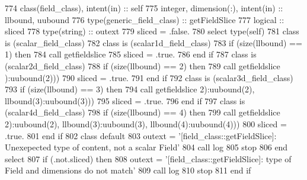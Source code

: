 \begin{DoxyCode}
774     \textcolor{keywordtype}{class}(field\_class), \textcolor{keywordtype}{intent(in)} :: self
775     \textcolor{keywordtype}{integer}, \textcolor{keywordtype}{dimension(:)}, \textcolor{keywordtype}{intent(in)} :: llbound, uubound
776     \textcolor{keywordtype}{type}(generic\_field\_class) :: getFieldSlice
777     \textcolor{keywordtype}{logical} :: sliced
778     \textcolor{keywordtype}{type}(string) :: outext
779     sliced = .false.
780     \textcolor{keywordflow}{select type}(self)
781 \textcolor{keywordflow}{    class is} (scalar\_field\_class)
782 \textcolor{keywordflow}{    class is} (scalar1d\_field\_class)
783         \textcolor{keywordflow}{if} (\textcolor{keyword}{size}(llbound) == 1) \textcolor{keywordflow}{then}
784             \textcolor{keyword}{call }getfieldslice%
785             sliced = .true.
786 \textcolor{keywordflow}{        end if}
787 \textcolor{keywordflow}{    class is} (scalar2d\_field\_class)
788         \textcolor{keywordflow}{if} (\textcolor{keyword}{size}(llbound) == 2) \textcolor{keywordflow}{then}
789             \textcolor{keyword}{call }getfieldslice%
      ):uubound(2)))
790             sliced = .true.
791 \textcolor{keywordflow}{        end if}
792 \textcolor{keywordflow}{    class is} (scalar3d\_field\_class)
793         \textcolor{keywordflow}{if} (\textcolor{keyword}{size}(llbound) == 3) \textcolor{keywordflow}{then}
794             \textcolor{keyword}{call }getfieldslice%
      2):uubound(2), llbound(3):uubound(3)))
795             sliced = .true.
796 \textcolor{keywordflow}{        end if}
797 \textcolor{keywordflow}{    class is} (scalar4d\_field\_class)
798         \textcolor{keywordflow}{if} (\textcolor{keyword}{size}(llbound) == 4) \textcolor{keywordflow}{then}
799             \textcolor{keyword}{call }getfieldslice%
      2):uubound(2), llbound(3):uubound(3), llbound(4):uubound(4)))
800             sliced = .true.
801 \textcolor{keywordflow}{        end if}
802 \textcolor{keywordflow}{        class default}
803         outext = \textcolor{stringliteral}{'[field\_class::getFieldSlice]: Unexepected type of content, not a scalar Field'}
804         \textcolor{keyword}{call }log%
805         stop
806 \textcolor{keywordflow}{    end select}
807     \textcolor{keywordflow}{if} (.not.sliced) \textcolor{keywordflow}{then}
808         outext = \textcolor{stringliteral}{'[field\_class::getFieldSlice]: type of Field and dimensions do not match'}
809         \textcolor{keyword}{call }log%
810         stop
811 \textcolor{keywordflow}{    end if}
\end{DoxyCode}
\mbox{\label{namespacefieldtypes__mod_a5faf9c157541acaa9681be2d59eda850}} 
